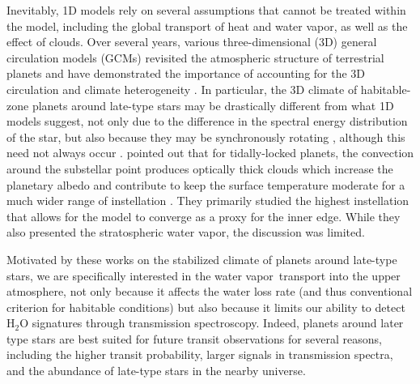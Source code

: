 \documentclass[11pt,numberedappendix,twocolappendix,]{emulateapj}
\def\water{H$_2$O }
\newcommand{\wv}{water vapor\ }
\begin{document}
Inevitably, 1D models rely on several assumptions that cannot be treated within the model, including the global transport of heat and water vapor, as well as the effect of clouds. 
Over several years, various three-dimensional (3D) general circulation models (GCMs) revisited the atmospheric structure of terrestrial planets and have demonstrated the importance of accounting for the 3D circulation and climate heterogeneity \citep[e.g.][]{Ishiwatari2002,Abe2011,Leconte2013a,Leconte2013b,Wolf2014,Wolf2015}. 
In particular, the 3D climate of habitable-zone planets around late-type stars may be drastically different from what 1D models suggest, not only due to the difference in the spectral energy distribution of the star, but also because they may be synchronously rotating \citep{Dole1964, Kasting1993}, although this need not always occur \citep{Goldreich1966,Leconte2015}.  
%
\citet{Yang2013} pointed out that for tidally-locked planets, the convection around the substellar point produces optically thick clouds which increase the planetary albedo and contribute to keep the surface temperature moderate for a much wider range of instellation \citep[see also][]{Yang2014,Way2015,Kopparapu2016}. 
They primarily studied the highest instellation that allows for the model to converge as a proxy for the inner edge. 
While they also presented the stratospheric water vapor, the discussion was limited. 

Motivated by these works on the stabilized climate of planets around late-type stars, we are specifically interested in the \wv transport into the upper atmosphere, not only because it affects the water loss rate (and thus conventional criterion for habitable conditions) but also because it limits our ability to detect \water signatures through transmission spectroscopy. 
%
Indeed, planets around later type stars are best suited for future transit observations for several reasons, including the higher transit probability, larger signals in transmission spectra, and the abundance of late-type stars in the nearby universe. 
\end{document}
